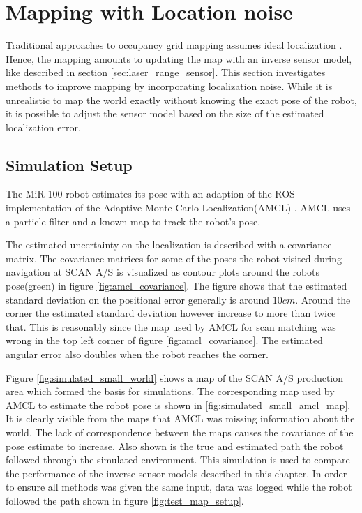 \section{Mapping with Location noise}
\label{sec:mapping_with_location_noise}

Traditional approaches to occupancy grid mapping assumes ideal localization \cite{probRob}. 
Hence, the mapping amounts to updating the map with an inverse sensor model, like described in section \vref{sec:laser_range_sensor}.
This section investigates methods to improve mapping by incorporating localization noise.
While it is unrealistic to map the world exactly without knowing the exact pose of the robot, it is possible to adjust the sensor model based on the size of the estimated localization error.

\subsection{Simulation Setup}
The MiR-100 robot estimates its pose with an adaption of the ROS implementation \cite{ros_amcl} of the Adaptive Monte Carlo Localization(AMCL) \cite{Thrun200199}. AMCL uses a particle filter and a known map to track the robot's pose. 

The estimated uncertainty on the localization is described with a covariance matrix. 
The covariance matrices for some of the poses the robot visited during navigation at SCAN A/S is visualized as contour plots around the robots pose(green) in figure \vref{fig:amcl_covariance}. 
The figure shows that the estimated standard deviation on the positional error generally is around $10cm$. Around the corner the estimated standard deviation however increase to more than twice that. This is reasonably since the map used by AMCL for scan matching was wrong in the top left corner of figure \vref{fig:amcl_covariance}. The estimated angular error also doubles when the robot reaches the corner.

Figure \vref{fig:simulated_small_world} shows a map of the SCAN A/S production area which formed the basis for simulations. The corresponding map used by AMCL to estimate the robot pose is shown in \vref{fig:simulated_small_amcl_map}.
It is clearly visible from the maps that AMCL was missing information about the world. The lack of correspondence between the maps causes the covariance of the pose estimate to increase. 
Also shown is the true and estimated path the robot followed through the simulated environment. This simulation is used to compare the performance of the inverse sensor models described in this chapter. In order to ensure all methods was given the same input, data was logged while the robot followed the path shown in figure \vref{fig:test_map_setup}.

